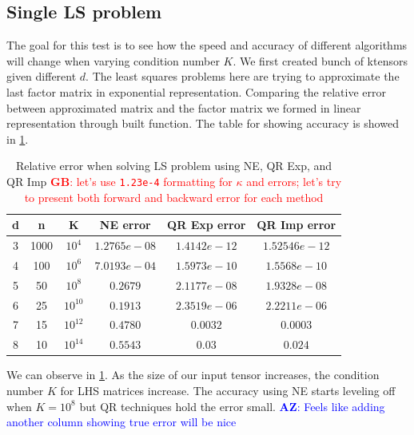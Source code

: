\documentclass{article}
\newcommand{\T}[2][]{#1{\mathbf{\cal{#2}}}} 						%
\newcommand{\GB}[1]{\textcolor{red}{\textbf{GB}: #1}}
\newcommand{\AZ}[1]{\textcolor{blue}{\textbf{AZ}: #1}}
\begin{document}
\subsection*{Single LS problem}


The goal for this test is to see how the speed and accuracy of different algorithms will change when varying condition number $K$.
We first created bunch of ktensors given different $d$. The least squares problems here are trying to approximate the last factor matrix in exponential representation. Comparing the relative error between approximated matrix and the factor matrix we formed in linear representation through built function. 
The table for showing accuracy is showed in \cref{tab:LS_error}.

\begin{table}[!ht] 
  \centering
  \begin{tabular}{|c|c|c|c|c|c|}
    \hline
    \multicolumn{1}{|c|}{\textbf{d}} & \multicolumn{1}{|c|}{\textbf{n}} & \multicolumn{1}{|c|}{\textbf{K}} & \multicolumn{1}{|c|}{\textbf{NE error}} & \multicolumn{1}{|c|}{\textbf{QR Exp error}} & \multicolumn{1}{|c|}{\textbf{QR Imp error}} \\
    \hline
    3 &1000&$10^4$ &  $1.2765e-08$& $1.4142e-12$& $1.52546e-12$ \\
    4 &100 &$10^6$& $7.0193e-04$& $1.5973e-10$& $1.5568e-10$\\
    5&50 &$10^8$& $0.2679$& $2.1177e-08$ & $1.9328e-08$\\
    6 & 25&$10^{10}$& $0.1913$& $2.3519e-06$ & $2.2211e-06$\\
    7 & 15 & $10^{12}$ & $0.4780$&$0.0032$ & $0.0003$\\
    8 & 10& $10^{14}$ & $0.5543$ & $0.03$ & $0.024$\\
    \hline
  \end{tabular}
  \caption{Relative error when solving LS problem using NE, QR Exp, and QR Imp \GB{let's use \texttt{1.23e-4} formatting for $\kappa$ and errors; let's try to present both forward and backward error for each method}}
  \label{tab:LS_error}
\end{table}
We can observe in \cref{tab:LS_error}. As the size of our input tensor increases, the condition number $K$ for LHS matrices increase.
The accuracy using NE starts leveling off when $K = 10^8$ but QR techniques hold the error small.
\AZ{Feels like adding another column showing true error will be nice} 
\end{document}
